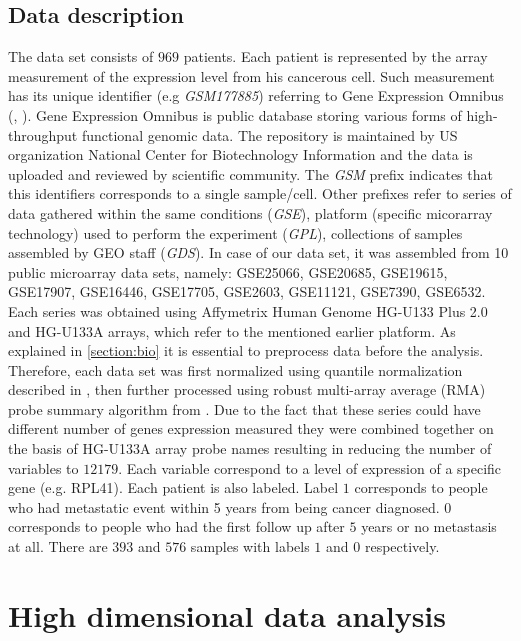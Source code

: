 \documentclass[12pt, wide]{mwart}
\begin{document}
\subsection{Data description} \label{section:description}

The data set consists of $969$ patients. Each patient is represented by the array measurement of the expression level from his cancerous cell. Such measurement has its unique identifier (e.g \textit{GSM177885}) referring to Gene Expression Omnibus (\cite{GEO}, \cite{NCBI2}). Gene Expression Omnibus is public database storing various forms of high-throughput functional genomic data. The repository is maintained by US organization National Center for Biotechnology Information and the data is uploaded and reviewed by scientific community. The \textit{GSM} prefix indicates that this identifiers corresponds to a single sample/cell. Other prefixes refer to series of data gathered within the same conditions (\textit{GSE}), platform (specific micorarray technology) used to perform the experiment (\textit{GPL}), collections of samples assembled by GEO staff (\textit{GDS}). In case of our data set, it was assembled from 10 public microarray data sets, namely: GSE25066, GSE20685, GSE19615, GSE17907, GSE16446, GSE17705, GSE2603, GSE11121, GSE7390, GSE6532. Each series was obtained using Affymetrix Human Genome HG-U133 Plus 2.0 and HG-U133A arrays, which refer to the mentioned earlier platform. As explained in \ref{section:bio} it is essential to preprocess data before the analysis. Therefore, each data set was first normalized using quantile normalization described in \cite{quantileNorm}, then further processed using robust multi-array average (RMA) probe summary algorithm from \cite{preprocessing}. Due to the fact that these series could have different number of genes expression measured they were combined together on the basis of HG-U133A array probe names resulting in reducing the number of variables to $12179$. Each variable correspond to a level of expression of a specific gene (e.g. RPL41). Each patient is also labeled. Label $1$ corresponds to people who had metastatic event within 5 years from being cancer diagnosed. $0$ corresponds to people who had the first follow up after $5$ years or no metastasis at all. There are $393$ and $576$ samples with labels $1$ and $0$ respectively.

\section{High dimensional data analysis}
\end{document}
